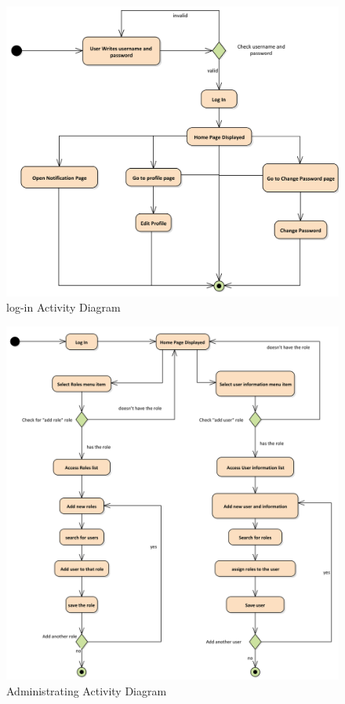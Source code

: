 \documentclass[12pt]{report} %
\begin{document}
\begin{figure}[h]
	\includegraphics[width=1\textwidth]{pic/Activity/login.png}
	\caption{log-in Activity Diagram}
	\label{fig:login}
\end{figure}


\begin{figure}[h]
	\includegraphics[width=1\textwidth]{pic/Activity/administration.png}
	\caption{Administrating Activity Diagram}
	\label{fig:administration}
\end{figure}
\end{document}

